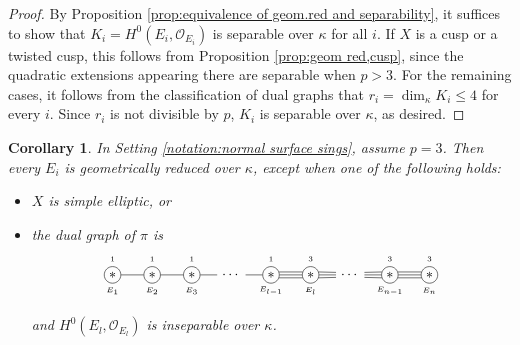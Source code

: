 \documentclass[12pt]{amsart}
\def\le{\leqslant}
\newcommand{\sO}{\mathcal{O}}
\theoremstyle{plain}
\newtheorem{cor}[thm]{Corollary}
\theoremstyle{definition}
\theoremstyle{remark}
\newtheorem{defn and notation}[thm]{Definition and Notation}
\theoremstyle{plain}
\numberwithin{equation}{thm}
\begin{document}
\begin{proof}
    By Proposition \ref{prop:equivalence of geom.red and separability}, it suffices to show that $K_i = H^0(E_i,\sO_{E_i})$ is separable over $\kappa$ for all $i$.
    If $X$ is a cusp or a twisted cusp, this follows from Proposition \ref{prop:geom red,cusp}, since the quadratic extensions appearing there are separable when $p>3$.
    For the remaining cases, it follows from the classification of dual graphs that $r_i=\dim_{\kappa}K_i \le 4$ for every $i$.
    Since $r_i$ is not divisible by $p$, $K_i$ is separable over $\kappa$, as desired.
\end{proof}

\begin{cor}\label{cor:geom red,p=3}    
In Setting \ref{notation:normal surface sings}, assume $p=3$.
Then every $E_i$ is geometrically reduced over $\kappa$, except when one of the following holds:
    \begin{itemize}
        \item $X$ is simple elliptic, or 
        \item the dual graph of $\pi$ is 
    \[
\begin{tikzpicture}
\node[draw, shape=circle, inner sep=1.8pt] (E1) at (1,0){$*$};
\node[draw, shape=circle, inner sep=1.8pt] (E2) at (2,0){$*$};
\node[draw, shape=circle, inner sep=1.8pt] (E3) at (3,0){$*$};
\draw node (dot) at (4,0){$\cdots$};
\node[draw, shape=circle, inner sep=1.8pt] (E_{l-1}) at (5,0){$*$};
\node[draw, shape=circle, inner sep=1.8pt] (E_l) at (6,0){$*$};
\draw node (dot2) at (7,0){$\cdots$};
\node[draw, shape=circle, inner sep=1.8pt] (E_{n-1}) at (8,0){$*$};
\node[draw, shape=circle, inner sep=1.8pt] (E_n) at (9,0){$*$};

\draw[shift={(0,0.4)}] (1,0) node{\tiny $1$};
\draw[shift={(0,0.4)}] (2,0) node{\tiny $1$};
\draw[shift={(0,0.4)}] (3,0) node{\tiny $1$};
\draw[shift={(0,0.4)}] (4,0) node{\tiny ${}$};
\draw[shift={(0,0.4)}] (5,0) node{\tiny $1$};
\draw[shift={(0,0.4)}] (6,0) node{\tiny $3$};
\draw[shift={(0,0.4)}] (8,0) node{\tiny $3$};
\draw[shift={(0,0.4)}] (9,0) node{\tiny $3$};

\draw[shift={(0,-0.4)}] (1,0) node{\tiny $E_1$};
\draw[shift={(0,-0.4)}] (2,0) node{\tiny $E_2$};
\draw[shift={(0,-0.4)}] (3,0) node{\tiny $E_3$};
\draw[shift={(0,-0.4)}] (5,0) node{\tiny $E_{l-1}$};
\draw[shift={(0,-0.4)}] (6,0) node{\tiny $E_l$};
\draw[shift={(0,-0.4)}] (8,0) node{\tiny $E_{n-1}$};
\draw[shift={(0,-0.4)}] (9,0) node{\tiny $E_n$};


\draw (E1)--(E2);
\draw (E2)--(E3);
\draw (E3)--(dot);
\draw (dot)--(E_{l-1});
\draw (E_{l-1}.-20)--(E_l.-160);
\draw (E_{l-1})--(E_l);
\draw (E_{l-1}.20)--(E_l.160);
\draw (E_l.-20)--(dot2.-170);
\draw (E_l)--(dot2);
\draw (E_l.20)--(dot2.170);
\draw (dot2)--(E_{n-1});
\draw (dot2.-10)--(E_{n-1}.-160);
\draw (dot2.10)--(E_{n-1}.160);
\draw (E_{n-1}.-20)--(E_n.-160);
\draw (E_{n-1})--(E_n);
\draw (E_{n-1}.20)--(E_n.160);

\end{tikzpicture}
        \]
        and $H^0(E_l, \sO_{E_l})$ is inseparable over $\kappa$.
        \end{itemize}
\end{cor}
\end{document}
